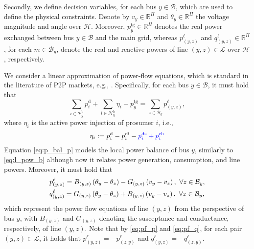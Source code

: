 \documentclass{IEEEtran}  %
\newcommand{\mc}{\mathcal}
\newcommand{\bb}{\mathbb}
\newcommand{\0}{\mathbf{0}}
\newcommand{\1}{\mathbf{1}}
\newcommand{\edit}[1]{\color{blue}{#1}\color{black}}
\begin{document}
Secondly, we define decision variables, for each bus $y \in \mc B$, which are used to define the physical constraints. Denote by $v_y \in \bb R^H$ and $\theta_y \in \bb R^H$ the voltage magnitude and angle over $\mc H$.  Moreover, $p^{\mathrm{tg}}_y \in \mathbb{R}^H$ denotes the real power exchanged between bus $y \in \mc B$ and the main grid, whereas $p_{(y,z)}^{\ell}$ and $q_{(y,z)}^{\ell} \in \bb R^H$, for each $m \in \mc B_y$, denote the real and reactive powers of line $(y,z) \in \mc L$ over $\mc H$, respectively. 

\smallskip
We consider a linear approximation of power-flow equations, which is standard in the literature of P2P markets, e.g., \cite{yang2019,moret2020}. Specifically, for each bus $y \in \mc B$, it must hold that
\begin{equation}
\sum_{i \in \mc P_y^\mathrm{b}}p_i^{\mathrm{d}}+ \sum_{i\in \mc N_y^{\mathrm b}} \eta_i-p_{y}^{\mathrm{tg}}=\sum_{z\in \mc B_y}p_{(y,z)}^{\ell}, \label{eq:p_bal_p}
\end{equation}
where $\eta_i$ is the active power injection of prosumer $i$, i.e.,
\begin{equation}\label{eq:etai}
\eta_i:= p_i^{\mathrm d}-p_{i}^{\mathrm{di}}-\edit{p_{i}^{\mathrm{ds}}+p_{i}^{\mathrm{ch}}}
\end{equation}
Equation \eqref{eq:p_bal_p} models the local power balance of bus $y$, similarly to \eqref{eq:l_pow_b} although now it relates power generation, consumption, and line powers. Moreover, it must hold that
\begin{subequations}
\small
\label{eq:pf_pq}
\begin{align}
&p_{(y,z)}^{\ell} = B_{(y,z)}\left({\theta_y - \theta_z} \right) - G_{(y,z)}\left(v_y - v_z \right), \, \, \forall z \in \mc B_y, \label{eq:pf_p}\\
&q_{(y,z)}^{\ell} = G_{(y,z)}\left({\theta_y - \theta_z} \right) + B_{(y,z)}\left(v_y - v_z \right), \, \,  \forall z \in \mc B_y, \label{eq:pf_q}
\end{align}
\label{eq:pf_all}
\end{subequations}
which represent the power flow equations of line $(y,z)$ from the perspective of bus $y$, with $B_{(y,z)}$ and  $G_{(y,z)}$ denoting the susceptance and conductance, respectively, of line $(y,z)$. Note that by \eqref{eq:pf_p} and \eqref{eq:pf_q}, for each pair $(y,z) \in \mc L$, it holds that $p_{(y,z)}^{\ell} = {-p}_{(z,y)}^{\ell}$ and $q_{(y,z)}^{\ell} = {-q}_{(z,y)}^{\ell}$. 
\end{document}

